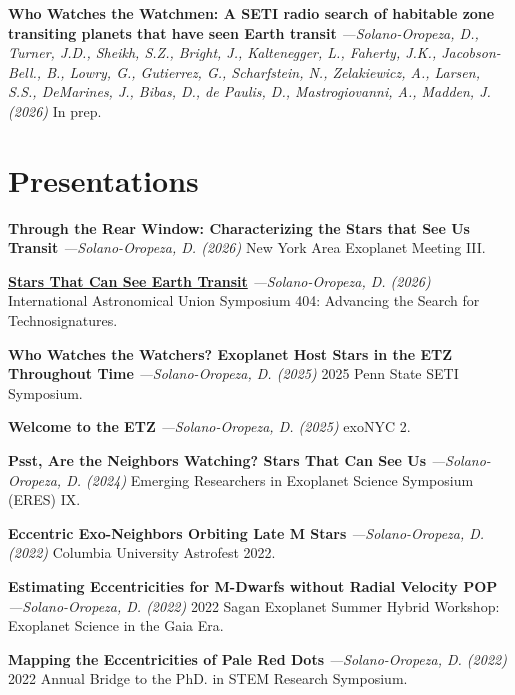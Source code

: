 \documentclass[a4paper,11pt]{article}
\begin{document}
    \textbf{Who Watches the Watchmen: A SETI radio search of habitable zone
    transiting planets that have seen Earth transit} \textit{—Solano-Oropeza, D., Turner, J.D., Sheikh, S.Z., Bright, J., Kaltenegger, L., Faherty, J.K., Jacobson-Bell., B., Lowry, G., Gutierrez, G., Scharfstein, N., Zelakiewicz, A., Larsen, S.S., DeMarines, J., Bibas, D., de Paulis, D., Mastrogiovanni, A., Madden, J. (2026)} In prep.

\section{Presentations}

    \textbf{Through the Rear Window: Characterizing the Stars that See Us Transit} \textit{—Solano-Oropeza, D. (2026)} New York Area Exoplanet Meeting III.
    \vspace{1.5mm}

    \href{https://www.youtube.com/watch?v=O2IKiK4_YOQ}{\textbf{Stars That Can See Earth Transit}} \textit{—Solano-Oropeza, D. (2026)} International Astronomical Union Symposium 404: Advancing the Search for Technosignatures. \vspace{1.5mm}

    \textbf{Who Watches the Watchers? Exoplanet Host Stars in the ETZ Throughout Time} \textit{—Solano-Oropeza, D. (2025)} 2025 Penn State SETI Symposium. \vspace{1.5mm}

    \textbf{Welcome to the ETZ} \textit{—Solano-Oropeza, D. (2025)} exoNYC 2. \vspace{1.5mm}

    \textbf{Psst, Are the Neighbors Watching? Stars That Can See Us} \textit{—Solano-Oropeza, D. (2024)} Emerging Researchers in Exoplanet Science Symposium (ERES) IX.
    \vspace{1.5mm}
    
    \textbf{Eccentric Exo-Neighbors Orbiting Late M Stars} \textit{—Solano-Oropeza, D. (2022)} Columbia University Astrofest 2022.
    \vspace{1.5mm}
    
    \textbf{Estimating Eccentricities for M-Dwarfs without Radial Velocity POP} \textit{—Solano-Oropeza, D. (2022)} 2022 Sagan Exoplanet Summer Hybrid Workshop: Exoplanet Science in the Gaia Era.
    \vspace{1.5mm}

    \textbf{Mapping the Eccentricities of Pale Red Dots} \textit{—Solano-Oropeza, D. (2022)} 2022 Annual Bridge to the PhD. in STEM Research Symposium.
    \vspace{1.5mm}
    
\end{document}
